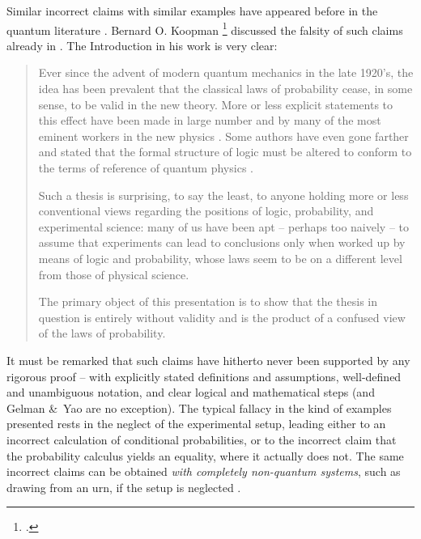 \documentclass[\ifafour a4paper,12pt,\else a5paper,10pt,\fi%
onecolumn,oneside,article,%
british%
]{memoir}
\theoremstyle{remark}
\theoremstyle{innote}
\newcommand*{\citep}{\parencites}%
\newcommand*{\citey}{\parencites*}
\newcommand*{\amp}{\&}
\renewcommand*{\|}[1][]{\nonscript\,#1\vert\nonscript\;\mathopen{}}
\newcommand*{\sect}{\S}%
\newcommand*{\eg}{{e.g.}}
\begin{document}
Similar incorrect claims with similar examples have appeared before in the
quantum literature \citep[see \eg][]{brukneretal2001}. Bernard O. Koopman
\footcite[of the Pitman-Koopman theorem for sufficient
statistics,][]{koopman1936} discussed the falsity of such claims already in
\cite*{koopman1957}. The Introduction in his work is very clear:
\begin{quotation}\footnotesize
  Ever since the advent of modern quantum mechanics in the late
  1920's, the idea has been prevalent that the classical laws of
  probability cease, in some sense, to be valid in the new theory. More or
  less explicit statements to this effect have been made in large number
  and by many of the most eminent workers in the new physics \textelp{}.
  Some authors have even gone farther and stated that the formal structure
  of logic must be altered to conform to the terms of reference of quantum
  physics \textelp{}.

  Such a thesis is surprising, to say the least, to anyone holding more or
  less conventional views regarding the positions of logic, probability,
  and experimental science: many of us have been apt -- perhaps too naively
  -- to assume that experiments can lead to conclusions only when worked up
  by means of logic and probability, whose laws seem to be on a different
  level from those of physical science.

  The primary object of this presentation is to show that the thesis in
  question is entirely without validity and is the product of a confused
  view of the laws of probability.
\end{quotation}


It must be remarked that such claims have hitherto never been supported by
any rigorous proof -- with explicitly stated definitions and assumptions,
well-defined and unambiguous notation, and clear logical and mathematical
steps (and Gelman \amp\ Yao are no exception). The typical fallacy in the
kind of examples presented rests in the neglect of the experimental setup,
leading either to an incorrect calculation of conditional probabilities, or
to the incorrect claim that the probability calculus yields an equality,
where it actually does not. The same incorrect claims can be obtained
\emph{with completely non-quantum systems}, such as drawing from an urn, if
the setup is neglected
\citep{kirkpatrick2001_r2003,kirkpatrick2002_r2003}[\sect~IV]{portamana2003_r2004}.
\end{document}

